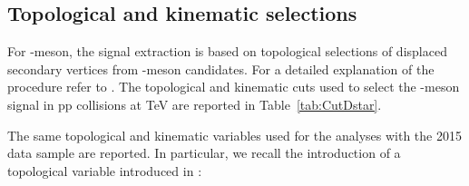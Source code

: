   

\subsection{Topological and kinematic selections}
For \Dstar -meson, the signal extraction is based on topological selections of displaced secondary vertices from \Dzero -meson candidates. For a detailed explanation of the procedure refer to \cite{Adam:2015sza}. The topological and kinematic cuts used to select the \Dstar -meson signal in pp collisions at  TeV are reported in Table~\ref{tab:CutDstar}.

The same topological and kinematic variables used for the analyses with the 2015 \pbpb data sample are reported. In particular, we recall the introduction of a topological variable introduced in \cite{Bruna:2016mgn} :


